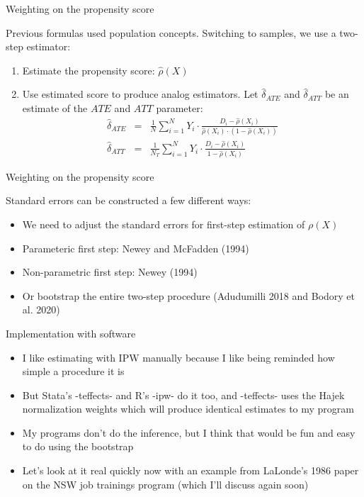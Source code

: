 \documentclass{beamer}
\begin{document}
\begin{frame}{Weighting on the propensity score}

Previous formulas used population concepts. Switching to samples, we use a two-step estimator:
	\begin{enumerate}
	\item Estimate the propensity score: $\widehat{\rho}(X)$
	\item Use estimated score to produce analog estimators. Let $\widehat{\delta}_{ATE}$ and $\widehat{\delta}_{ATT}$  be an estimate of the $ATE$ and $ATT$ parameter:
		\begin{eqnarray*}
		\widehat{\delta}_{ATE} &=& \frac{1}{N} \sum_{i=1}^N Y_i \cdot \frac{D_i - \widehat{\rho}(X_i)}{\widehat{\rho}(X_i) \cdot (1-\widehat{\rho}(X_i))}\\
		\widehat{\delta}_{ATT} &=& \frac{1}{N_T} \sum_{i=1}^N Y_i \cdot \frac{D_i - \widehat{\rho}(X_i)}{1-\widehat{\rho}(X_i)}
		\end{eqnarray*}
	\end{enumerate}
\end{frame}

\begin{frame}{Weighting on the propensity score}
	
		
Standard errors can be constructed a few different ways:
	\begin{itemize}
	\item We need to adjust the standard errors for first-step estimation of $\rho(X)$
	\item Parameteric first step: Newey and McFadden (1994)
	\item Non-parametric first step: Newey (1994)
	\item Or bootstrap the entire two-step procedure (Adudumilli 2018 and Bodory et al. 2020)
	\end{itemize}
\end{frame}



\begin{frame}{Implementation with software}

\begin{itemize}
\item I like estimating with IPW manually because I like being reminded how simple a procedure it is
\item But Stata's -teffects- and R's -ipw- do it too, and -teffects- uses the Hajek normalization weights which will produce identical estimates to my program
\item My programs don't do the inference, but I think that would be fun and easy to do using the bootstrap
\item Let's look at it real quickly now with an example from LaLonde's 1986 paper on the NSW job trainings program (which I'll discuss again soon)
\end{itemize}

\end{frame}
\end{document}

